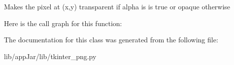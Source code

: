 \begin{DoxyVerb}Makes the pixel at (x,y) transparent if alpha is is true or opaque otherwise\end{DoxyVerb}
 Here is the call graph for this function\+:


The documentation for this class was generated from the following file\+:\begin{DoxyCompactItemize}
\item 
lib/app\+Jar/lib/tkinter\+\_\+png.\+py\end{DoxyCompactItemize}
